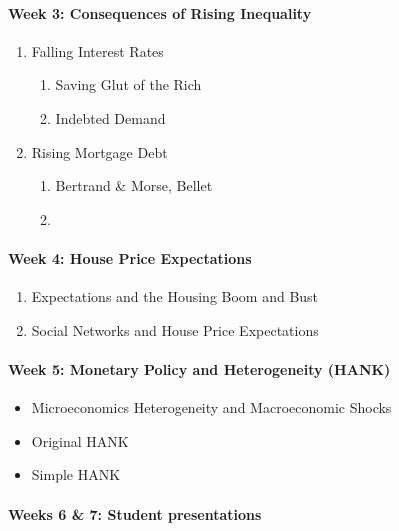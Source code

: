 \documentclass[a4paper,11pt]{article}
\begin{document}
\paragraph{Week 3: Consequences of Rising Inequality}

\begin{enumerate}
\item Falling Interest Rates
  \begin{enumerate}
  \item Saving Glut of the Rich \citep{kumhof2015inequality}
  \item Indebted Demand \citep{mian2021indebted-demand}
  \end{enumerate}
\item Rising Mortgage Debt
  \begin{enumerate}
  \item Bertrand \& Morse, Bellet
  \item \citet{drechsel2021falling-behind}
  \end{enumerate}
\end{enumerate}

\paragraph{Week 4: House Price Expectations}
\begin{enumerate}
\item Expectations and the Housing Boom and Bust \citep{kaplan2018microeconomic}
\item Social Networks and House Price Expectations \citep{bailey2019beliefs-leverage,bailey2018housing}
\end{enumerate}

\paragraph{Week 5: Monetary Policy and Heterogeneity (HANK)}
\begin{itemize}
\item Microeconomics Heterogeneity and Macroeconomic Shocks \citep{kaplan2018microeconomic}
\item Original HANK \citep{kaplan2018monetary}
\item Simple HANK \citep{bilbiie2018analytical}
\end{itemize}

\paragraph{Weeks 6 \& 7: Student presentations}


\end{document}
